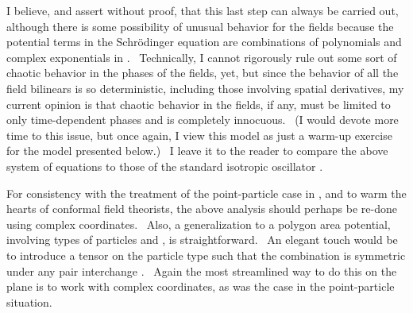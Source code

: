 \documentclass[a4paper,12pt]{article}%
\begin{document}
I believe, and assert without proof, that this last step can always be carried
out, although there is some possibility of unusual behavior for the fields
because the potential terms in the Schr\"{o}dinger equation are combinations
of polynomials and complex exponentials in \coordHE{}. \ Technically, I cannot
rigorously rule out some sort of chaotic behavior in the phases of the fields,
yet, but since the behavior of all the field bilinears is so deterministic,
including those involving spatial derivatives, my current opinion is that
chaotic behavior in the fields, if any, must be limited to only time-dependent
phases and is completely innocuous. \ (I would devote more time to this issue,
but once again, I view this model as just a warm-up exercise for the \coordHE{}
model presented below.) \ I leave it to the reader to compare the above system
of equations to those of the standard isotropic oscillator \cite{Lewis,Mahan}.

For consistency with the treatment of the point-particle case in \cite{CPZ},
and to warm the hearts of conformal field theorists, the above analysis should
perhaps be re-done using complex coordinates. \ Also, a generalization to a
polygon area potential, involving \coordHE{} types of particles and \coordHE{}, is straightforward. \ An elegant touch
would be to introduce a tensor \coordHE{} on the particle type
such that the combination \coordHE{} is symmetric under any
pair interchange \coordHE{}.
\ Again the most streamlined way to do this on the plane is to work with
complex coordinates, as was the case in the point-particle situation.
\end{document}
